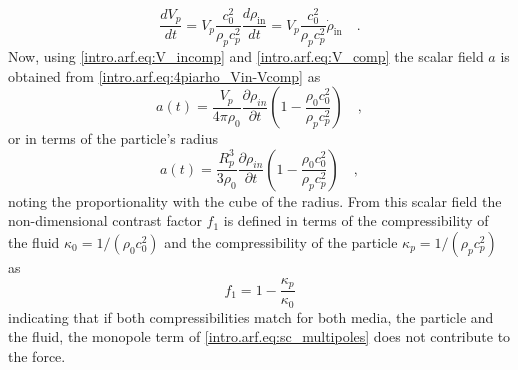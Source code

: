 \begin{equation}\label{intro.arf.eq:V_comp}
    \frac{dV_p}{dt} = V_p\frac{c_0^2}{\rho_p c_p^2} \frac{d\rho_{\text{in}}}{dt} = V_p\frac{c_0^2}{\rho_p c_p^2}\dot{\rho}_{\text{in}}\quad.
\end{equation}
Now, using \eqref{intro.arf.eq:V_incomp} and \eqref{intro.arf.eq:V_comp} the scalar field $a$ is obtained from \eqref{intro.arf.eq:4piarho_Vin-Vcomp} as
\begin{equation}\label{intro.arf.eq:a_field_Vp}
    a(t) = \frac{V_p}{4\pi\rho_0}\frac{\partial\rho_{in}}{\partial t}\left(1-\frac{\rho_0c_0^2}{\rho_pc_p^2}\right)\quad,
\end{equation}
or in terms of the particle's radius  
\begin{equation}\label{intro.arf.eq:a_field_Rp}
    a(t) = \frac{R_p^3}{3\rho_0}\frac{\partial\rho_{in}}{\partial t}\left(1-\frac{\rho_0c_0^2}{\rho_pc_p^2}\right)\quad,
\end{equation}
noting the proportionality with the cube of the radius. From this scalar field the non-dimensional contrast factor $f_1$ is defined in terms of the compressibility of the fluid $\kappa_0 = 1/(\rho_0c_0^2)$ and the compressibility of the particle $\kappa_p = 1/(\rho_pc_p^2)$ as
\begin{equation}\label{intro.arf.eq:f1}
    f_1 = 1-\frac{\kappa_p}{\kappa_0}
\end{equation}
indicating that if both compressibilities match for both media, the particle and the fluid, the monopole term of \eqref{intro.arf.eq:sc_multipoles} does not contribute to the force. 

